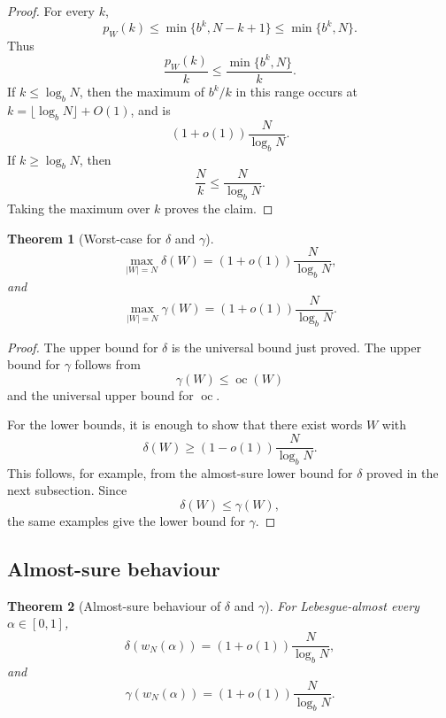 \documentclass[11pt]{amsart}
\newtheorem{theorem}{Theorem}[section]
\DeclareMathOperator{\oc}{oc}
\begin{document}
\begin{proof}
For every $k$,
\[
p_W(k)\leq \min\{b^k,N-k+1\}\leq \min\{b^k,N\}.
\]
Thus
\[
\frac{p_W(k)}{k}
\leq
\frac{\min\{b^k,N\}}{k}.
\]
If $k\leq \log_b N$, then the maximum of $b^k/k$ in this range occurs at $k=\lfloor\log_b N\rfloor+O(1)$, and is
\[
(1+o(1))\frac{N}{\log_b N}.
\]
If $k\geq \log_b N$, then
\[
\frac{N}{k}\leq \frac{N}{\log_b N}.
\]
Taking the maximum over $k$ proves the claim.
\end{proof}

\begin{theorem}[Worst-case for $\delta$ and $\gamma$]
\[
\max_{|W|=N}\delta(W)
=
(1+o(1))\frac{N}{\log_b N},
\]
and
\[
\max_{|W|=N}\gamma(W)
=
(1+o(1))\frac{N}{\log_b N}.
\]
\end{theorem}

\begin{proof}
The upper bound for $\delta$ is the universal bound just proved. The upper bound for $\gamma$ follows from
\[
\gamma(W)\leq \oc(W)
\]
and the universal upper bound for $\oc$.

For the lower bounds, it is enough to show that there exist words $W$ with
\[
\delta(W)\geq(1-o(1))\frac{N}{\log_b N}.
\]
This follows, for example, from the almost-sure lower bound for $\delta$ proved in the next subsection. Since
\[
\delta(W)\leq\gamma(W),
\]
the same examples give the lower bound for $\gamma$.
\end{proof}

\subsection{Almost-sure behaviour}

\begin{theorem}[Almost-sure behaviour of $\delta$ and $\gamma$]
For Lebesgue-almost every $\alpha\in[0,1]$,
\[
\delta(w_N(\alpha))
=
(1+o(1))\frac{N}{\log_b N},
\]
and
\[
\gamma(w_N(\alpha))
=
(1+o(1))\frac{N}{\log_b N}.
\]
\end{theorem}
\end{document}

